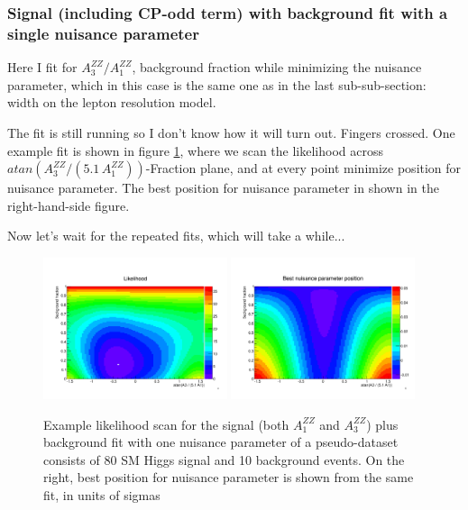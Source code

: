 \documentclass{cmspaper}
\begin{document}
\subsubsection{Signal (including CP-odd term) with background fit with a single nuisance parameter}

Here I fit for $A_3^{ZZ}/A_1^{ZZ}$, background fraction while minimizing the nuisance parameter, which
in this case is the same one as in the last sub-sub-section: width on the lepton resolution model.

The fit is still running so I don't know how it will turn out.  Fingers crossed.  One example fit
is shown in figure \ref{fig:A1A3BNFitLikelihoodExample}, where we scan the likelihood across
$atan(A_3^{ZZ}/(5.1\,A_1^{ZZ}))$-Fraction plane, and at every point minimize position for
nuisance parameter.  The best position for nuisance parameter in shown in the right-hand-side figure.

Now let's wait for the repeated fits, which will take a while...


\begin{figure}[htb!]
  \begin{center}
    \includegraphics[width=0.48\textwidth]{figures/A1A3BNFit_LikelihoodExample.pdf}
    \includegraphics[width=0.48\textwidth]{figures/A1A3BNFit_NuisancePositionExample.pdf}
    \caption{Example likelihood scan for the signal (both $A_1^{ZZ}$ and $A_3^{ZZ}$) plus background fit
    with one nuisance parameter of a pseudo-dataset consists of 80 SM Higgs signal and 10 background events.
    On the right, best position for nuisance parameter is shown from the same fit, in units of sigmas}
    \label{fig:A1A3BNFitLikelihoodExample}
  \end{center}
\end{figure}
\end{document}
